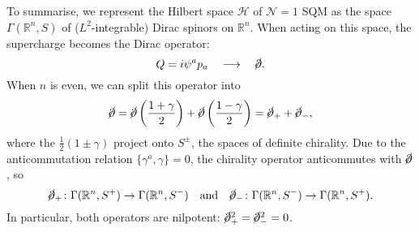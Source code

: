To summarise, we represent the Hilbert space $\mathscr{H}$ of $\mathcal{N} = 1$ SQM as the space $\Gamma(\mathbb{R}^n, S)$  of ($L^2$-integrable) Dirac spinors on $\mathbb{R}^n$. When acting on this space, the supercharge becomes the Dirac operator:
\begin{equation}
  Q = i \psi^a p_a \quad \longrightarrow \quad \cancel{\partial}.
\end{equation}
When $n$ is even, we can split this operator into
\begin{equation}
  \cancel{\partial} = \cancel{\partial} \left( \frac{1 + \gamma}{2} \right) + \cancel{\partial} \left( \frac{1 - \gamma}{2} \right) = \cancel{\partial}_+ + \cancel{\partial}_-, 
\end{equation}
where the $\frac{1}{2}( 1 \pm \gamma)$ project onto $S^{\pm}$, the spaces of definite chirality.
Due to the anticommutation relation $\{\gamma^a, \gamma\} = 0$, the chirality operator anticommutes with $\cancel{\partial}$, so
\begin{equation}
  \cancel{\partial}_+ \colon \Gamma(\mathbb{R}^n, S^+) \to \Gamma(\mathbb{R}^n, S^-) \quad \text{and} \quad \cancel{\partial}_- \colon \Gamma(\mathbb{R}^n, S^-) \to \Gamma(\mathbb{R}^n, S^+).
\end{equation}
In particular, both operators are nilpotent: $\cancel{\partial}^2_+ = \cancel{\partial}_-^2 = 0$.
